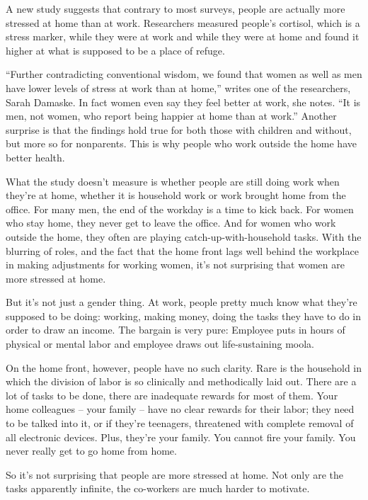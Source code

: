 A new study suggests that contrary to most surveys, people are actually more stressed at home than at work. Researchers measured people's cortisol, which is a stress marker, while they were at work and while they were at home and found it higher at what is supposed to be a place of refuge.


``Further contradicting conventional wisdom, we found that women as well as men have lower levels of stress at work than at home,'' writes one of the researchers, Sarah Damaske. In fact women even say they feel better at work, she notes. ``It is men, not women, who report being happier at home than at work.'' Another surprise is that the findings hold true for both those with children and without, but more so for nonparents. This is why people who work outside the home have better health.


What the study doesn't measure is whether people are still doing work when they're at home, whether it is household work or work brought home from the office. For many men, the end of the workday is a time to kick back. For women who stay home, they never get to leave the office. And for women who work outside the home, they often are playing catch-up-with-household tasks. With the blurring of roles, and the fact that the home front lags well behind the workplace in making adjustments for working women, it's not surprising that women are more stressed at home.


But it's not just a gender thing. At work, people pretty much know what they're supposed to be doing: working, making money, doing the tasks they have to do in order to draw an income. The bargain is very pure: Employee puts in hours of physical or mental labor and employee draws out life-sustaining moola.


On the home front, however, people have no such clarity. Rare is the household in which the division of labor is so clinically and methodically laid out. There are a lot of tasks to be done, there are inadequate rewards for most of them. Your home colleagues – your family – have no clear rewards for their labor; they need to be talked into it, or if they're teenagers, threatened with complete removal of all electronic devices. Plus, they're your family. You cannot fire your family. You never really get to go home from home.


So it's not surprising that people are more stressed at home. Not only are the tasks apparently infinite, the co-workers are much harder to motivate.